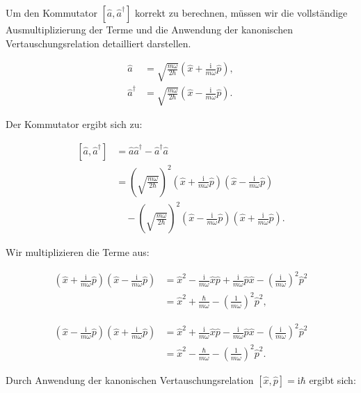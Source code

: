 Um den Kommutator $\left[\hat{a}, \hat{a}^{\dagger}\right]$ korrekt zu berechnen, müssen wir die vollständige Ausmultiplizierung der Terme und die Anwendung der kanonischen Vertauschungsrelation detailliert darstellen.

\begin{align*}
\hat{a} &= \sqrt{\frac{m \omega}{2 \hbar}}\left(\hat{x} + \frac{\mathrm{i}}{m \omega} \hat{p}\right), \\
\hat{a}^{\dagger} &= \sqrt{\frac{m \omega}{2 \hbar}}\left(\hat{x} - \frac{\mathrm{i}}{m \omega} \hat{p}\right).
\end{align*}

Der Kommutator ergibt sich zu:

\begin{align*}
\left[\hat{a}, \hat{a}^{\dagger}\right] &= \hat{a} \hat{a}^{\dagger} - \hat{a}^{\dagger} \hat{a} \\
&= \left(\sqrt{\frac{m \omega}{2 \hbar}}\right)^2 \left(\hat{x} + \frac{\mathrm{i}}{m \omega} \hat{p}\right)\left(\hat{x} - \frac{\mathrm{i}}{m \omega} \hat{p}\right) \\
&\quad - \left(\sqrt{\frac{m \omega}{2 \hbar}}\right)^2 \left(\hat{x} - \frac{\mathrm{i}}{m \omega} \hat{p}\right)\left(\hat{x} + \frac{\mathrm{i}}{m \omega} \hat{p}\right).
\end{align*}

Wir multiplizieren die Terme aus:

\begin{align*}
\left(\hat{x} + \frac{\mathrm{i}}{m \omega} \hat{p}\right)\left(\hat{x} - \frac{\mathrm{i}}{m \omega} \hat{p}\right) &= \hat{x}^2 - \frac{\mathrm{i}}{m \omega} \hat{x}\hat{p} + \frac{\mathrm{i}}{m \omega} \hat{p}\hat{x} - \left(\frac{\mathrm{i}}{m \omega}\right)^2 \hat{p}^2 \\
&= \hat{x}^2 + \frac{\hbar}{m \omega} - \left(\frac{1}{m \omega}\right)^2 \hat{p}^2,
\end{align*}

\begin{align*}
\left(\hat{x} - \frac{\mathrm{i}}{m \omega} \hat{p}\right)\left(\hat{x} + \frac{\mathrm{i}}{m \omega} \hat{p}\right) &= \hat{x}^2 + \frac{\mathrm{i}}{m \omega} \hat{x}\hat{p} - \frac{\mathrm{i}}{m \omega} \hat{p}\hat{x} - \left(\frac{\mathrm{i}}{m \omega}\right)^2 \hat{p}^2 \\
&= \hat{x}^2 - \frac{\hbar}{m \omega} - \left(\frac{1}{m \omega}\right)^2 \hat{p}^2.
\end{align*}

Durch Anwendung der kanonischen Vertauschungsrelation $\left[\hat{x}, \hat{p}\right] = \mathrm{i} \hbar$ ergibt sich:

